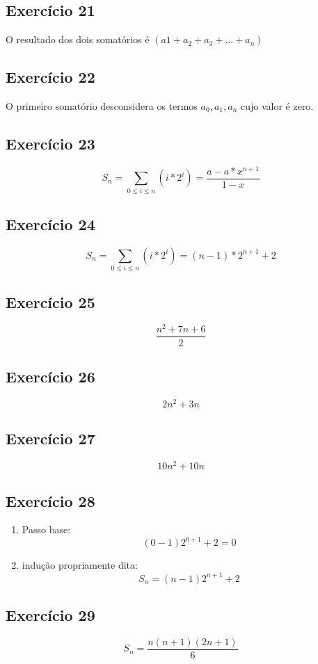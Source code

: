 \documentclass[12pt]{article}
\begin{document}
\subsection{Exercício 21}
O resultado dos dois somatórios é $(a1+ a_2 + a_3 + ... + a_n)$
\subsection{Exercício 22}
O primeiro somatório desconsidera os termos $a_0, a_1, a_n$ cujo valor é zero.
\subsection{Exercício 23}
\begingroup
\LARGE    
\begin{equation}
S_n = \sum_{0\leq i\leq n}(i*2^i) = \frac{a-a*x^{n+1}}{1-x}
\end{equation}
\endgroup
\subsection{Exercício 24}
\begingroup
\LARGE    
\begin{equation}
S_n = \sum_{0\leq i\leq n}(i*2^i) = (n-1)*2^{n+1}+2
\end{equation}
\endgroup
\subsection{Exercício 25}
\begingroup
\LARGE    
\begin{equation}
\frac{n^2+7n+6}{2}
\end{equation}
\endgroup
\subsection{Exercício 26}
\begingroup
\LARGE    
\begin{equation}
2n^2+3n
\end{equation}
\endgroup
\subsection{Exercício 27}
\begingroup
\LARGE    
\begin{equation}
10n^2+10n
\end{equation}
\endgroup
\subsection{Exercício 28}
\begin{enumerate}
    \item Passo base:
        \begingroup
        \LARGE    
        \begin{equation}
            (0-1)2^{0+1}+2=0
        \end{equation}
        \endgroup
        \item indução propriamente dita:
        \begingroup
        \LARGE    
        \begin{equation}
            S_n = (n-1)2^{n+1}+2
        \end{equation}
        \endgroup
\end{enumerate}
    \subsection{Exercício 29}
    \begingroup
    \LARGE    
    \begin{equation}
        S_n = \frac{n(n+1)(2n+1)}{6}
    \end{equation}
    \endgroup
\end{document}
